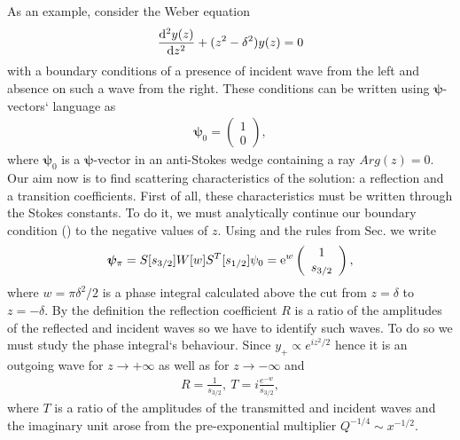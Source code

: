 \documentclass[12pt]{iopart}
\def\psii{\bm\psi}
\begin{document}
As an example, consider the Weber equation
\begin{eqnarray}
\frac{\mathrm{d}^2 y(z)}{\mathrm{d} z^2}+(z^2-\delta^2)y(z)=0
\label{eq:weber}
\end{eqnarray}
with a boundary conditions of a presence of incident wave from the left and absence on such a wave from the right. These conditions can be written using $\psii$-vectors` language as
\begin{eqnarray}
\psii_0 = \left(\begin{array}{*{2}{c}} 1 \\ 0 \end{array}\right),
\label{eq:wbound}
\end{eqnarray}
where $\psii_0$ is a $\psii$-vector in an anti-Stokes wedge containing a ray $Arg(z)=0$. Our aim now is to find scattering characteristics of the solution: a reflection and a transition coefficients. First of all, these characteristics must be written through the Stokes constants. To do it, we must analytically continue our boundary condition () 
to the negative values of $z$. Using  and the rules from Sec. we write
\begin{eqnarray}
\psii_{\pi} = S[s_{3/2}]W[w]S^T[s_{1/2}]\psi_0 = 
\rme^w \left(\begin{array}{*{2}{c}} 1 \\ s_{3/2} \end{array}\right),
\end{eqnarray}
where $w=\pi\delta^2/2$ is a phase integral calculated above the cut from $z=\delta$ to $z=-\delta$. By the definition the reflection coefficient $R$ is a ratio of the amplitudes of the reflected and incident waves so we have to identify such waves. To do so we must study the phase integral`s behaviour. Since $y_+ \propto e^{i z^2/2}$ hence it is an outgoing wave for $z \rightarrow +\infty$ as well as for $z \rightarrow -\infty$ and
\begin{eqnarray}
R = \frac{1}{s_{3/2}},\ T=i\frac{e^{-w}}{s_{3/2}},
\label{rt}
\end{eqnarray}
where $T$ is a ratio of the amplitudes of the transmitted and incident waves and the imaginary unit arose from the pre-exponential multiplier $Q^{-1/4} \sim x^{-1/2}$.
\end{document}
